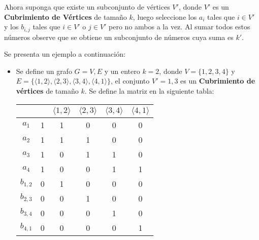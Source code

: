 \documentclass{article}
\begin{document}
Ahora suponga que existe un subconjunto de vértices $V'$, donde $V'$ es un \textbf{Cubrimiento de Vértices} de tamaño $k$, luego seleccione
los $a_i$ tales que $i\in V'$ y los $b_{i,j}$ tales que $i\in V'$ o $j\in V'$ pero no ambos a la vez. Al sumar todos estos números
observe que se obtiene un subconjunto de números cuya suma es $k'$.

Se presenta un ejemplo a continuación:
\begin{itemize}
    \item Se define un grafo $G=V,E$ y un entero $k=2$, donde $V=\{1,2,3,4\}$ y $E=\{\langle 1, 2 \rangle ,\langle 2, 3 \rangle ,\langle 3, 4 \rangle ,\langle 4, 1 \rangle\}$,
          el conjunto $V'={1,3}$ es un \textbf{Cubrimiento de vértices} de tamaño $k$. Se define la matriz en la siguiente tabla:

          \begin{table}[h]
              \centering
              \begin{tabular}{|c|c|c|c|c|c|}
                  \hline
                            &   & $\langle 1, 2 \rangle$ & $\langle 2, 3 \rangle$ & $\langle 3, 4 \rangle$ & $\langle 4, 1 \rangle$ \\ \hline
                  $a_1$     & 1 & 1                      & 0                      & 0                      & 0                      \\ \hline
                  $a_2$     & 1 & 1                      & 1                      & 0                      & 0                      \\ \hline
                  $a_3$     & 1 & 0                      & 1                      & 1                      & 0                      \\ \hline
                  $a_4$     & 1 & 0                      & 0                      & 1                      & 1                      \\ \hline
                  $b_{1,2}$ & 0 & 1                      & 0                      & 0                      & 0                      \\ \hline
                  $b_{2,3}$ & 0 & 0                      & 1                      & 0                      & 0                      \\ \hline
                  $b_{3,4}$ & 0 & 0                      & 0                      & 1                      & 0                      \\ \hline
                  $b_{4,1}$ & 0 & 0                      & 0                      & 0                      & 1                      \\ \hline
              \end{tabular}
          \end{table}


\end{itemize}
\end{document}
